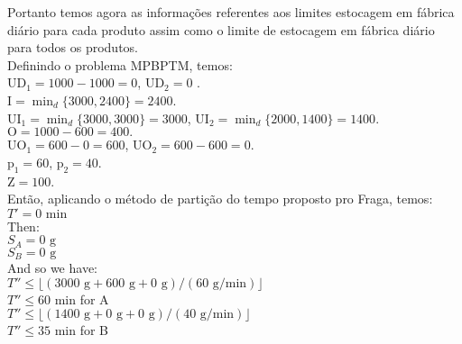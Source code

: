 \documentclass[authoryear,preprint,12pt]{elsarticle}
\begin{document}
Portanto temos agora as informações referentes aos limites estocagem em fábrica diário para cada produto assim como o limite de estocagem em fábrica diário para todos os produtos. \\

Definindo o problema MPBPTM, temos: \\

$\textrm{UD}_{1} = 1000 - 1000 = 0$,
$\textrm{UD}_{2} = 0$ . \\

$\textrm{I} = \min_{d} \{3000, 2400\} = 2400$. \\

$ \textrm{UI}_{1} = \min_{d} \{3000, 3000\} = 3000 $,
$ \textrm{UI}_{2} = \min_{d} \{2000, 1400\} = 1400 $. \\

$\textrm{O} = 1000 - 600 = 400.$ \\

$\textrm{UO}_{1} = 600 - 0 = 600$, 
$\textrm{UO}_{2} = 600 - 600 = 0$. \\

$\textrm{p}_{1} = 60$,
$\textrm{p}_{2} = 40$.  \\

$\textrm{Z} = 100$.  \\

Então, aplicando o método de partição do tempo proposto pro Fraga, temos: \\

$T' = 0 \textrm{ min}$ \\

Then:\\

$S_A = 0 \textrm{ g}$ \\

$S_B = 0 \textrm{ g}$ \\

And so we have: \\

$T'' \leq \lfloor{(3000 \textrm{ g} + 600 \textrm{ g} + 0 \textrm{ g}) / (60 \textrm{ g}/\textrm{min})}\rfloor$ \\

$T'' \leq 60 \textrm{ min}$ \quad for A \\

$T'' \leq \lfloor{(1400 \textrm{ g} + 0 \textrm{ g} + 0 \textrm{ g}) / (40 \textrm{ g}/\textrm{min})}\rfloor$ \\

$T'' \leq 35 \textrm{ min}$ \quad for B \\
\end{document}
